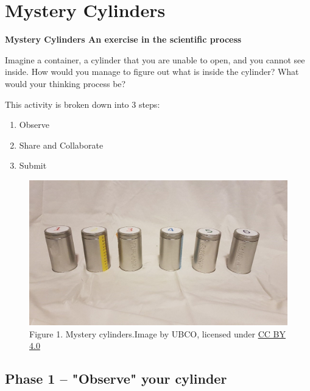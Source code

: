 \documentclass[
]{book}
\providecommand{\tightlist}{%
  \setlength{\itemsep}{0pt}\setlength{\parskip}{0pt}}
\begin{document}
\hypertarget{mystery-cylinders}{%
\section*{Mystery Cylinders}\label{mystery-cylinders}}

\textbf{Mystery Cylinders An exercise in the scientific process}

Imagine a container, a cylinder that you are unable to open, and you cannot see inside. How would you manage to figure out what is inside the cylinder? What would your thinking process be?

This activity is broken down into 3 steps:

\begin{enumerate}
\def\labelenumi{\arabic{enumi}.}
\tightlist
\item
  Observe
\item
  Share and Collaborate
\item
  Submit
\end{enumerate}

\begin{figure}
\centering
\includegraphics{figures_images/Lab2a-Fig1.jpg}
\caption{Figure 1. Mystery cylinders.Image by UBCO, licensed under \href{https://creativecommons.org/licenses/by/4.0/}{CC BY 4.0}}
\end{figure}

\hypertarget{phase-1-observe-your-cylinder}{%
\subsection*{Phase 1 -- "Observe" your cylinder}\label{phase-1-observe-your-cylinder}}
\end{document}
